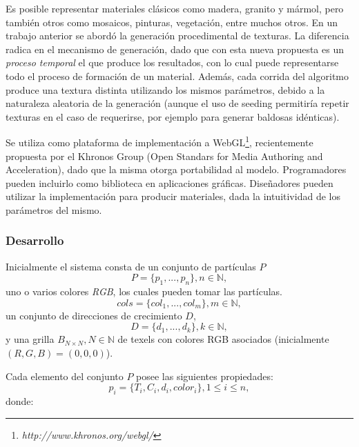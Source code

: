 \documentclass[spanish,a4paper,11pt,oneside,links]{report}
\begin{document}
Es posible representar materiales cl\'asicos como madera, granito y m\'armol, pero tambi\'en otros como mosaicos, pinturas, vegetaci\'on, entre muchos otros.
En un trabajo anterior \cite{Baravalle2010} se abord\'o la generaci\'on procedimental de texturas.
La diferencia radica en el mecanismo de generaci\'on, dado que con esta nueva propuesta es un {\em proceso temporal} el que produce los resultados, con lo cual puede representarse todo el proceso de formaci\'on de un material.
Adem\'as, cada corrida del algoritmo produce una textura distinta utilizando los mismos par\'ametros, debido a la naturaleza aleatoria de la generaci\'on (aunque el uso de seeding permitir\'ia repetir texturas en el caso de requerirse, por ejemplo para generar baldosas id\'enticas).

Se utiliza como plataforma de implementaci\'on a WebGL\footnote{\em http://www.khronos.org/webgl/}, recientemente propuesta por el Khronos Group (Open Standars for Media Authoring and Acceleration), dado que la misma otorga portabilidad al modelo. 
Programadores pueden incluirlo como biblioteca en aplicaciones gr\'aficas.
Dise\~nadores pueden utilizar la implementaci\'on para producir materiales, dada la intuitividad de los par\'ametros del mismo.

\subsubsection{Desarrollo}
Inicialmente el sistema consta de un conjunto de part\'iculas $P$
\begin{equation}
P = \{p_{1}, ... , p_{n}\}, n  \in \mathbb{N},
\end{equation}
uno o varios colores {\em RGB}, los cuales pueden tomar las part\'iculas.
\begin{equation}
cols = \{col_{1}, ... , col_{m} \}, m \in \mathbb{N},
\end{equation}
un conjunto de direcciones de crecimiento $D$,
\begin{equation}
D = \{d_{1}, ... , d_{k} \}, k \in \mathbb{N},
\end{equation}
y una grilla $B_{N\times N}, N \in \mathbb{N} $ de texels con colores RGB asociados (inicialmente $(R,G,B)=(0,0,0)$).

Cada elemento del conjunto $P$ posee las siguientes propiedades:
\begin{equation}
p_{i} = \{T_{i}, C_{i}, d_{i}, color_{i}\}, 1 \le i \le n,
\end{equation}
donde:
\end{document}
